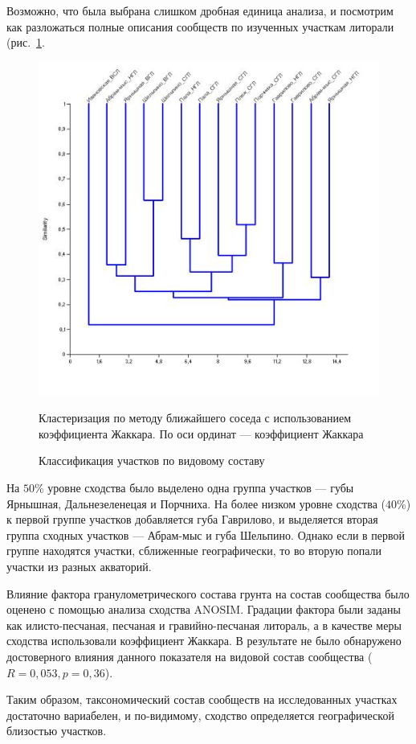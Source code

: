 Возможно, что была выбрана слишком дробная единица анализа, и посмотрим как разложаться полные описания сообществ по изученных участкам литорали (рис.~\ref{ris:cluster_barents_species_sites}. 
	\begin{figure}
		\begin{center}
			\includegraphics{../Barenc_Sea/soobshestvo/soobshestvo_po_gorizontam_Jakkard_paired_group_clusters.jpg}
		\end{center}
	\caption{Классификация участков по видовому составу}
	\label{ris:cluster_barents_species_sites}

	\footnotesize{Кластеризация по методу ближайшего соседа с использованием коэффициента Жаккара. По оси ординат --- коэффициент Жаккара}
	\end{figure}
На $50$\% уровне сходства было выделено одна группа участков --- губы Ярнышная, Дальнезеленецая и Порчниха.  
На более низком уровне сходства ($40$\%) к первой группе участков добавляется губа Гаврилово, и выделяется вторая группа сходных участков --- Абрам-мыс и губа Шельпино. 
Однако если в первой группе находятся участки, сближенные географически, то во вторую попали участки из разных акваторий.  

Влияние фактора гранулометрического состава грунта на состав сообщества было оценено с помощью анализа сходства ANOSIM. 
Градации фактора были заданы как илисто-песчаная, песчаная и гравийно-песчаная литораль, а в качестве меры сходства использовали коэффициент Жаккара. 
В результате не было обнаружено достоверного влияния данного показателя на видовой состав сообщества ($R=0,053, p=0,36$).
	
Таким образом, таксономический состав сообществ на исследованных участках достаточно вариабелен, и по-видимому, сходство определяется географической близостью участков. 

